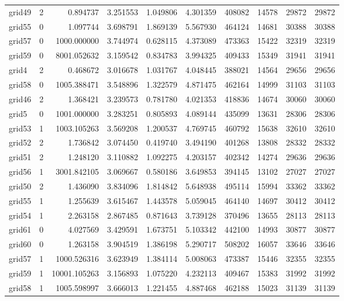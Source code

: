 \documentclass[../../../thesis.tex]{subfiles}
\begin{document}
\begin{longtable}{|l|r|r|r|r|r|r|r|r|r|}
grid49 & 2 & 0.894737 & 3.251553 & 1.049806 & 4.301359 & 408082 & 14578 & 29872 & 29872 \\
grid55 & 0 & 1.097744 & 3.698791 & 1.869139 & 5.567930 & 464124 & 14681 & 30388 & 30388 \\
grid57 & 0 & 1000.000000 & 3.744974 & 0.628115 & 4.373089 & 473363 & 15422 & 32319 & 32319 \\
grid59 & 0 & 8001.052632 & 3.159542 & 0.834783 & 3.994325 & 409433 & 15349 & 31941 & 31941 \\
grid4 & 2 & 0.468672 & 3.016678 & 1.031767 & 4.048445 & 388021 & 14564 & 29656 & 29656 \\
grid58 & 0 & 1005.388471 & 3.548896 & 1.322579 & 4.871475 & 462164 & 14999 & 31103 & 31103 \\
grid46 & 2 & 1.368421 & 3.239573 & 0.781780 & 4.021353 & 418836 & 14674 & 30060 & 30060 \\
grid5 & 0 & 1001.000000 & 3.283251 & 0.805893 & 4.089144 & 435099 & 13631 & 28306 & 28306 \\
grid53 & 1 & 1003.105263 & 3.569208 & 1.200537 & 4.769745 & 460792 & 15638 & 32610 & 32610 \\
grid52 & 2 & 1.736842 & 3.074450 & 0.419740 & 3.494190 & 401268 & 13808 & 28332 & 28332 \\
grid51 & 2 & 1.248120 & 3.110882 & 1.092275 & 4.203157 & 402342 & 14274 & 29636 & 29636 \\
grid56 & 1 & 3001.842105 & 3.069667 & 0.580186 & 3.649853 & 394145 & 13102 & 27027 & 27027 \\
grid50 & 2 & 1.436090 & 3.834096 & 1.814842 & 5.648938 & 495114 & 15994 & 33362 & 33362 \\
grid55 & 1 & 1.255639 & 3.615467 & 1.443578 & 5.059045 & 464140 & 14697 & 30412 & 30412 \\
grid54 & 1 & 2.263158 & 2.867485 & 0.871643 & 3.739128 & 370496 & 13655 & 28113 & 28113 \\
grid61 & 0 & 4.027569 & 3.429591 & 1.673751 & 5.103342 & 442100 & 14993 & 30877 & 30877 \\
grid60 & 0 & 1.263158 & 3.904519 & 1.386198 & 5.290717 & 508202 & 16057 & 33646 & 33646 \\
grid57 & 1 & 1000.526316 & 3.623949 & 1.384114 & 5.008063 & 473387 & 15446 & 32355 & 32355 \\
grid59 & 1 & 10001.105263 & 3.156893 & 1.075220 & 4.232113 & 409467 & 15383 & 31992 & 31992 \\
grid58 & 1 & 1005.598997 & 3.666013 & 1.221455 & 4.887468 & 462188 & 15023 & 31139 & 31139 \\

\end{longtable}
\end{document}
